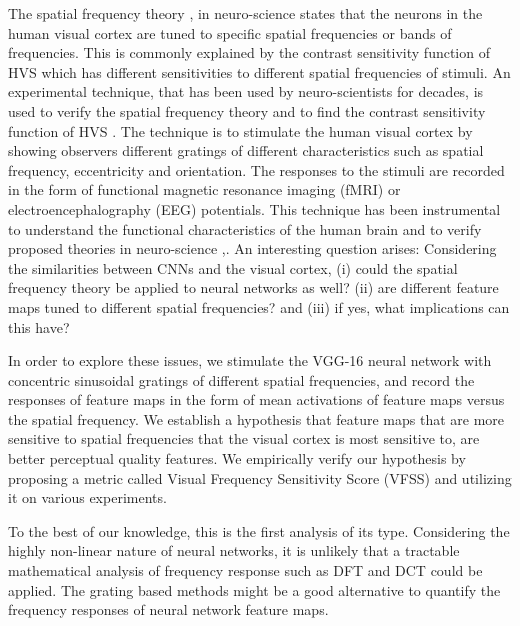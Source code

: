 \documentclass[10pt,twocolumn,letterpaper]{article}
\begin{document}
   The spatial frequency theory \cite{13},\cite{14} in neuro-science states that the neurons in the human visual cortex are tuned to specific spatial frequencies or bands of frequencies. This is commonly explained by the contrast sensitivity function of HVS which has different sensitivities to different spatial frequencies of stimuli. An experimental technique, that has been used by neuro-scientists for decades, is used to verify the spatial frequency theory and to find the contrast sensitivity function of HVS \cite{15}. The technique is to stimulate the human visual cortex by showing observers different gratings of different characteristics such as spatial frequency, eccentricity and orientation. The responses to the stimuli are recorded in the form of functional magnetic resonance imaging (fMRI) or electroencephalography (EEG) potentials. This technique has been instrumental to understand the functional characteristics of the human brain and to verify proposed theories in neuro-science \cite{16},\cite{17}. An interesting question arises: Considering the similarities between CNNs and the visual cortex, (i) could the spatial frequency theory be applied to neural networks as well? (ii) are different feature maps tuned to different spatial frequencies? and (iii) if yes, what implications can this have?
   
    In order to explore these issues, we stimulate the VGG-16 \cite{30} neural network with concentric sinusoidal gratings of different spatial frequencies, and record the responses of feature maps in the form of mean activations of feature maps versus the spatial frequency. We establish a hypothesis that feature maps that are more sensitive to  spatial frequencies that the visual cortex is most sensitive to, are better perceptual quality features. We empirically verify our hypothesis by proposing a metric called Visual Frequency Sensitivity Score (VFSS) and utilizing it on various experiments. 
    
   To the best of our knowledge, this is the first analysis of its type. Considering the highly non-linear nature of neural networks, it is unlikely that a tractable mathematical analysis of frequency response such as DFT and DCT could be applied. The grating based methods might be a good alternative to quantify the frequency responses of neural network feature maps.  
   
\end{document}
